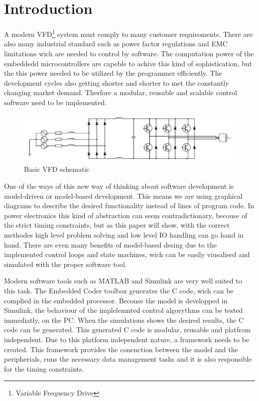 \section{Introduction}
A modern VFD\footnote{Variable Frequency Drive} system must comply to many customer requiroments. There are also many industrial standard such as power factor regulations and EMC limitations wich are needed to control by software. The computation power of the embeddedd microcontrollers are capeble to achive this kind of sophistication, but the this power needed to be utilized by the programmer efficiently. The development cycles also getting shorter and shorter to met the constantly changing market demand. Therfore a modular, reusable and scalable control software need to be implemented.

\begin{figure}[h]
\centering
\includegraphics[width=0.8\columnwidth]{figures/VFDschematic}

\caption{Basic VFD schematic}
\label{vfd_sch}
\end{figure}

One of the ways of this new way of thinking about software development is model-driven or model-based development. This means we are using graphical diagrams to describe the desired functionality instead of lines of program code. In power electronics this kind of abstraction can seem contradictionary, becouse  of the strict timing constraints, but as this paper will show, with the correct methodes high level problem solving and low level IO handling can go hand in hand. There are even many benefits of model-based desing due to the implemented control loops and state machines, wich can be easily viusalised and simulated with the proper software tool.

Modern software tools such as MATLAB and Simulink are very well suited to this task. The Embedded Coder toolbox generates the C code, wich can be complied in the embedded processor. Becouse the model is developped in Simulink, the behaviour of the implelemnted control algorythms can be tested immediatly, on the PC. When the simulations shows the desired results, the C code can be generated. This generated C code is modular, reusable and platfrom independent. Due to this platform independent nature, a framework needs to be created. This framework provides the conenction between the model and the peripherials, runs the necessary data management tasks and it is also responsible for the timing constraints.

